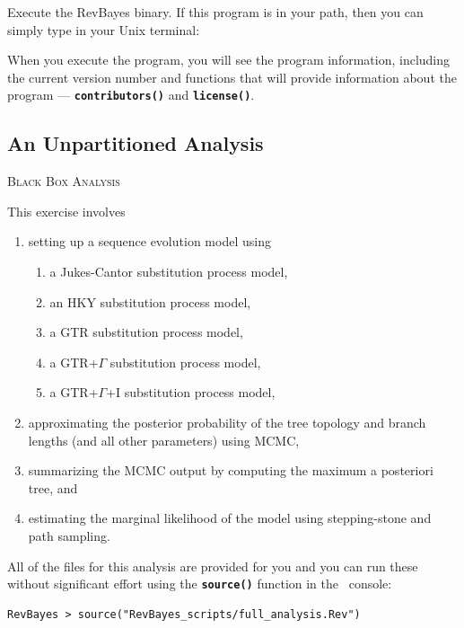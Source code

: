 \documentclass[11pt]{article}
\newcommand{\cl}[1]{{\texttt{\textbf{#1}}}}
\begin{document}
Execute the RevBayes binary. If this program is in your path, then you can simply type in your Unix terminal:

\exs{\cl{\$ rb}}

When you execute the program, you will see the program information, including the current version number and functions that will provide information about the program --- \cl{contributors()} and \cl{license()}. 




\bigskip
\subsection{An Unpartitioned Analysis}\label{secUnif} 

{\large \textcolor{mycol}{\textsc{Black Box Analysis}}}

This exercise involves 
\begin{enumerate}
\item setting up a sequence evolution model using
\begin{enumerate}
\item a Jukes-Cantor substitution process model,
\item an HKY substitution process model, 
\item a GTR substitution process model,
\item a GTR+$\Gamma$ substitution process model,
\item a GTR+$\Gamma$+I substitution process model,
\end{enumerate} 
\item approximating the posterior probability of the tree topology and branch lengths (and all other parameters) using MCMC,  
\item summarizing the MCMC output by computing the maximum a posteriori tree, and
\item estimating the marginal likelihood of the model using stepping-stone and path sampling. 
\end{enumerate}

All of the files for this analysis are provided for you and you can run these without significant effort using the \cl{source()} function in the \RevBayes~console:
{\tt \begin{snugshade*}
\begin{lstlisting}
RevBayes > source("RevBayes_scripts/full_analysis.Rev")
\end{lstlisting}
\end{snugshade*}}
\end{document}
